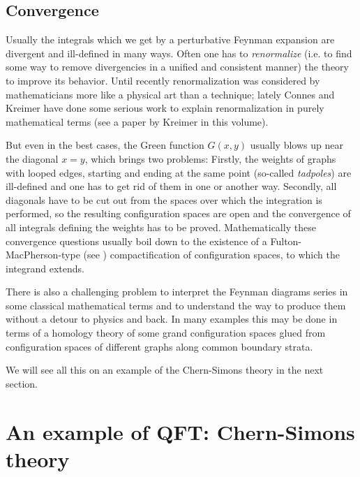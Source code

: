 \documentclass[10pt]{amsart}
\theoremstyle{definition}
\theoremstyle{remark}
\newcommand{\R}{\mathbb R}
\begin{document}
\subsection{Convergence}
\label{sub:divergence}
Usually the integrals which we get by a perturbative Feynman
expansion are divergent and ill-defined in many ways. Often
one has to {\em renormalize} (i.e. to find some way to remove
divergencies in a unified and consistent manner) the theory to
improve its behavior. Until recently renormalization was considered
by mathematicians more like a physical art than a technique;
lately Connes and Kreimer \cite{CK} have done some serious work
to explain renormalization in purely mathematical terms
(see a paper by Kreimer in this volume).

But even in the best cases, the Green function $G(x,y)$ usually
blows up near the diagonal $x=y$, which brings two problems:
Firstly, the weights of graphs with looped edges, starting and
ending at the same point (so-called {\em tadpoles}) are ill-defined
and one has to get rid of them in one or another way. Secondly,
all diagonals have to be cut out from the spaces over which the
integration is performed, so the resulting configuration spaces
are open and the convergence of all integrals defining the weights
has to be proved. Mathematically these convergence questions
usually boil down to the existence of a Fulton-MacPherson-type (see
\cite{FMcP}) compactification of configuration spaces, to which
the integrand extends.

There is also a challenging problem to interpret the Feynman
diagrams series in some classical mathematical terms and to
understand the way to produce them without a detour to physics
and back. In many examples this may be done in terms of a
homology theory of some grand configuration spaces glued from
configuration spaces of different graphs along common boundary
strata.

We will see all this on an example of the Chern-Simons theory
in the next section.


\section{An example of QFT: Chern-Simons theory}
\label{sec:CS}
\end{document}
